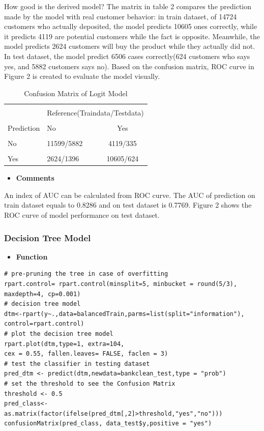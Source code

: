 How good is the derived model? The matrix in table 2 compares the prediction made by the model with real customer behavior: in train dataset, of 14724 customers who actually deposited, the model predicts 10605 ones correctly, while it predicts 4119 are potential customers while the fact is opposite. Meanwhile, the model predicts 2624 customers will buy the product while they actually did not. In test dataset, the model predict 6506 cases correctly(624 customers who says yes, and 5882 customers says no). Based on the confusion matrix, ROC curve in Figure 2 is created to evaluate the model visually. 
  \begin{center}
  	\begin{table}[!htbp]
  		\centering  
\begin{tabular}{llc}
	\hline
	\hline\\[-1.8ex]
	& \multicolumn{2}{c}{Reference(Traindata/Testdata)} \\
	\cline{2-3}\\[-1.8ex]
	Prediction & No & Yes \\
	\hline \\[-1.8ex] 
	No & 11599/5882 &4119/335 \\ 
	\hline \\[-1.8ex] 
	Yes& 2624/1396 &10605/624\\ 
	\hline
	\hline
\end{tabular}  
\caption{Confusion Matrix of Logit Model} 
\end{table}
\end{center}

\begin{itemize}
	\item \textbf{Comments}
\end{itemize}
\noindent An index of AUC can be calculated from ROC curve. The AUC of prediction on train dataset equals to 0.8286 and on test dataset is 0.7769. Figure 2 shows the ROC curve of model performance on test dataset. \\
	\subsubsection{Decision Tree Model}
	 \begin{itemize}
		\item \textbf{Function}
	\end{itemize}
	
	\begin{lstlisting}
# pre-pruning the tree in case of overfitting
rpart.control= rpart.control(minsplit=5, minbucket = round(5/3), maxdepth=4, cp=0.001)
# decision tree model
dtm<-rpart(y~.,data=balancedTrain,parms=list(split="information"),  control=rpart.control)
# plot the decision tree model
rpart.plot(dtm,type=1, extra=104,
cex = 0.55, fallen.leaves= FALSE, faclen = 3)
# test the classifier in testing dataset
pred_dtm <- predict(dtm,newdata=bankclean_test,type = "prob")
# set the threshold to see the Confusion Matrix
threshold <- 0.5
pred_class<-as.matrix(factor(ifelse(pred_dtm[,2]>threshold,"yes","no")))
confusionMatrix(pred_class, data_test$y,positive = "yes")
	\end{lstlisting}


